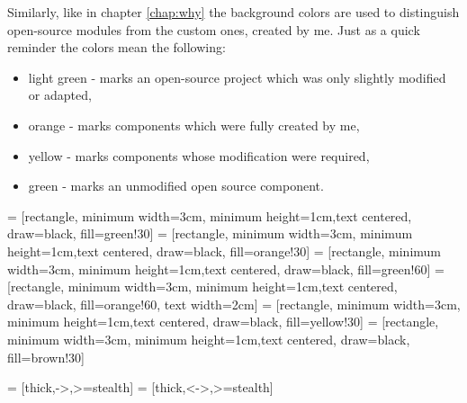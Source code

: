 Similarly, like in chapter \ref{chap:why} the background colors are used to distinguish open-source modules from the custom ones, created by me. Just as a quick reminder the colors mean the following:
\begin{itemize}
    \item \colorbox{green!30}{light green} - marks an open-source project which was only slightly modified or adapted,
    \item \colorbox{orange!30}{orange} - marks components which were fully created by me,
    \item \colorbox{yellow!30}{yellow} - marks components whose modification were required,
    \item \colorbox{green!60}{green} - marks an unmodified open source component.
\end{itemize}


 = [rectangle, minimum width=3cm, minimum height=1cm,text centered, draw=black, fill=green!30]
 = [rectangle, minimum width=3cm, minimum height=1cm,text centered, draw=black, fill=orange!30]
 = [rectangle, minimum width=3cm, minimum height=1cm,text centered, draw=black, fill=green!60]
 = [rectangle, minimum width=3cm, minimum height=1cm,text centered, draw=black, fill=orange!60, text width=2cm]
 = [rectangle, minimum width=3cm, minimum height=1cm,text centered, draw=black, fill=yellow!30]
 = [rectangle, minimum width=3cm, minimum height=1cm,text centered, draw=black, fill=brown!30]

 = [thick,->,>=stealth]
 = [thick,<->,>=stealth]

